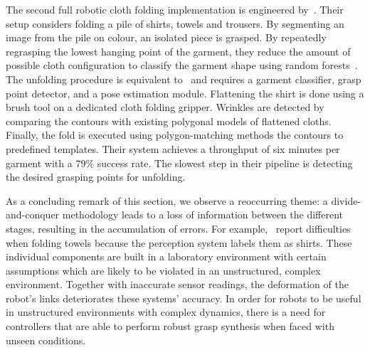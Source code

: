 The second full robotic cloth folding implementation is engineered by~\textcite{Doumanoglou2016}. Their setup considers folding a pile of shirts, towels and trousers. By segmenting an image from the pile on colour, an isolated piece is grasped. By repeatedly regrasping the lowest hanging point of the garment, they reduce the amount of possible cloth configuration to classify the garment shape using random forests~\autocite{Breiman2001}. The unfolding procedure is equivalent to~\autocite{Maitin2010} and requires a garment classifier, grasp point detector, and a pose estimation module. Flattening the shirt is done using a brush tool on a dedicated cloth folding gripper. Wrinkles are detected by comparing the contours with existing polygonal models of flattened cloths. Finally, the fold is executed using polygon-matching methods the contours to predefined templates.
Their system achieves a throughput of six minutes per garment with a $79\%$ success rate. The slowest step in their pipeline is detecting the desired grasping points for unfolding.

As a concluding remark of this section, we observe a reoccurring theme: a divide-and-conquer methodology leads to a loss of information between the different stages, resulting in the accumulation of errors. For example,~\textcite{Doumanoglou2016} report difficulties when folding towels because the perception system labels them as shirts. These individual components are built in a laboratory environment with certain assumptions which are likely to be violated in an unstructured, complex environment. Together with inaccurate sensor readings, the deformation of the robot's links deteriorates these systems' accuracy.
In order for robots to be useful in unstructured environments with complex dynamics, there is a need for controllers that are able to perform robust grasp synthesis when faced with unseen conditions.

